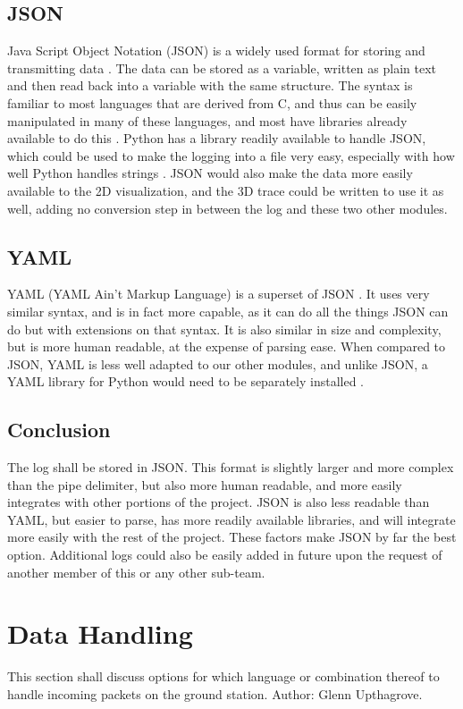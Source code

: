\documentclass[onecolumn, draftclsnofoot,10pt, compsoc]{IEEEtran}
\begin{document}
\subsection{JSON}
Java Script Object Notation (JSON) is a widely used format for storing and transmitting data \cite{refjson}. The data can be stored as a variable, written as plain text and then read back into a variable with the same structure. The syntax is familiar to most languages that are derived from C, and thus can be easily manipulated in many of these languages, and most have libraries already available to do this \cite{refjson}. Python has a library readily available to handle JSON, which could be used to make the logging into a file very easy, especially with how well Python handles strings \cite{refpython}. JSON would also make the data more easily available to the 2D visualization, and the 3D trace could be written to use it as well, adding no conversion step in between the log and these two other modules.
\subsection{YAML}
YAML (YAML Ain’t Markup Language) is a superset of JSON \cite{refyaml}. It uses very similar syntax, and is in fact more capable, as it can do all the things JSON can do but with extensions on that syntax. It is also similar in size and complexity, but is more human readable, at the expense of parsing ease. When compared to JSON, YAML is less well adapted to our other modules, and unlike JSON, a YAML library for Python would need to be separately installed \cite{refyamlii}.
\subsection{Conclusion}
The log shall be stored in JSON. This format is slightly larger and more complex than the pipe delimiter, but also more human readable, and more easily integrates with other portions of the project. JSON is also less readable than YAML, but easier to parse, has more readily available libraries, and will integrate more easily with the rest of the project. These factors make JSON by far the best option. Additional logs could also be easily added in future upon the request of another member of this or any other sub-team\cite{refgs}.

\section{Data Handling}
This section shall discuss options for which language or combination thereof to handle incoming packets on the ground station. Author: Glenn Upthagrove.
\end{document}
